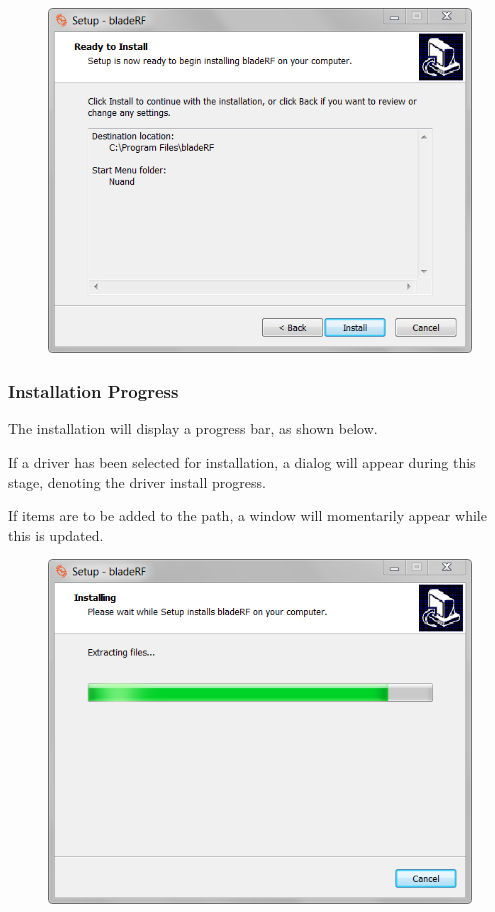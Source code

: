 {\begin{figure}[h]
  \centering
  \includegraphics{images/windows/installer/07-ready.png}
\end{figure}


\newpage
\subsubsection{Installation Progress}

The installation will display a progress bar, as shown below.

If a driver has been selected for installation, a dialog will appear
during this stage, denoting the driver install progress.

If items are to be added to the \matlab path, a \matlab window
will momentarily appear while this is updated.

\begin{figure}[h]
  \centering
  \includegraphics{images/windows/installer/08-installing.png}
\end{figure}

}
